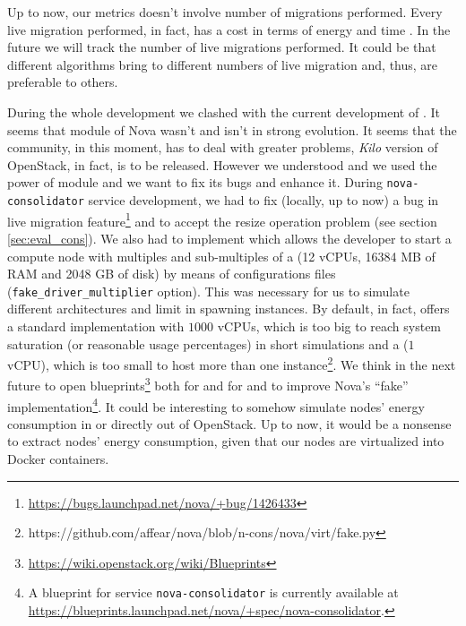 Up to now, our metrics doesn't involve number of migrations performed. Every live migration performed, in fact, has a cost in terms of energy and time . In the future we will track the number of live migrations performed. It could be that different algorithms bring to different numbers of live migration and, thus, are preferable to others.

During the whole development we clashed with the current development of . It seems that  module of Nova wasn't and isn't in strong evolution. It seems that the community, in this moment, has to deal with greater problems, \emph{Kilo} version of OpenStack, in fact, is to be released. However we understood and we used the power of  module and we want to fix its bugs and enhance it. During \texttt{nova-consolidator} service development, we had to fix (locally, up to now) a bug in live migration feature\footnote{\url{https://bugs.launchpad.net/nova/+bug/1426433}} and to accept the resize operation problem (see section \ref{sec:eval_cons}). We also had to implement  which allows the developer to start a compute node with multiples and sub-multiples of a  (12 vCPUs, 16384 MB of RAM and 2048 GB of disk) by means of configurations files (\texttt{fake\_driver\_multiplier} option). This was necessary for us to simulate different architectures and limit in spawning instances. By default, in fact,  offers a standard implementation with $1000$ vCPUs, which is too big to reach system saturation (or reasonable usage percentages) in short simulations and a  ($1$ vCPU), which is too small to host more than one instance\footnote{https://github.com/affear/nova/blob/n-cons/nova/virt/fake.py}. We think in the next future to open blueprints\footnote{\url{https://wiki.openstack.org/wiki/Blueprints}} both for  and for  and to improve Nova's ``fake'' implementation\footnote{A blueprint for service \texttt{nova-consolidator} is currently available at \url{https://blueprints.launchpad.net/nova/+spec/nova-consolidator}.}. It could be interesting to somehow simulate nodes' energy consumption in  or directly out of OpenStack. Up to now, it would be a nonsense to extract nodes' energy consumption, given that our nodes are virtualized into Docker containers.

